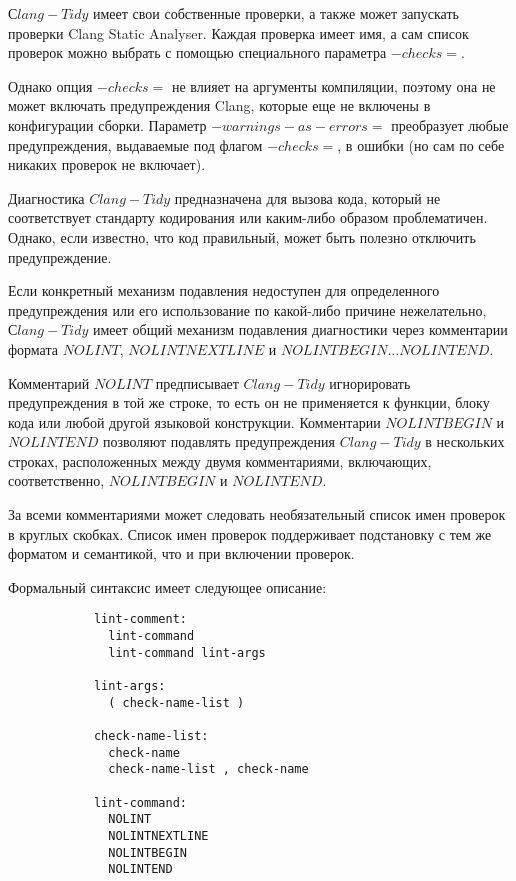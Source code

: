 \documentclass{mipt-thesis-bs}
\begin{document}
$Сlang-Tidy$ имеет свои собственные проверки, а также может запускать 
проверки Clang Static Analyser. Каждая проверка имеет имя, 
а сам список проверок можно выбрать с помощью специального параметра $-checks=$.

Однако опция $-checks=$ не влияет на аргументы компиляции, поэтому она 
не может включать предупреждения Clang, которые еще не включены в 
конфигурации сборки. Параметр $-warnings-as-errors=$ преобразует 
любые предупреждения, выдаваемые под флагом $-checks=$, в ошибки 
(но сам по себе никаких проверок не включает).

Диагностика $Clang-Tidy$ предназначена для вызова кода, который не 
соответствует стандарту кодирования или каким-либо образом проблематичен. 
Однако, если известно, что код правильный, может быть полезно отключить предупреждение.

Если конкретный механизм подавления недоступен для определенного 
предупреждения или его использование по какой-либо причине 
нежелательно, $Сlang-Tidy$ имеет общий механизм подавления 
диагностики через комментарии формата $NOLINT$,
$NOLINTNEXTLINE$ и $NOLINTBEGIN… NOLINTEND$.

Комментарий $NOLINT$ предписывает $Clang-Tidy$ игнорировать предупреждения 
в той же строке, то есть он не применяется к функции, блоку кода или любой 
другой языковой конструкции.
Комментарии $NOLINTBEGIN$ и $NOLINTEND$ позволяют подавлять предупреждения 
$Clang-Tidy$ в нескольких строках, расположенных между двумя 
комментариями, включающих, соответственно, $NOLINTBEGIN$ и $NOLINTEND$.

За всеми комментариями может следовать необязательный список имен 
проверок в круглых скобках. 
Список имен проверок поддерживает подстановку с тем же форматом 
и семантикой, что и при включении проверок.

Формальный синтаксис имеет следующее описание:
\begin{verbatim}
            lint-comment:
              lint-command
              lint-command lint-args
            
            lint-args:
              ( check-name-list )
            
            check-name-list:
              check-name
              check-name-list , check-name
            
            lint-command:
              NOLINT
              NOLINTNEXTLINE
              NOLINTBEGIN
              NOLINTEND
\end{verbatim}
\end{document}
